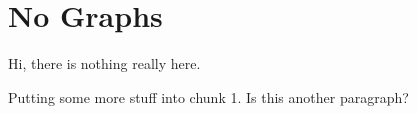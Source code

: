 \section{No Graphs}
\label{sec:NoGraph}
Hi, there is nothing really here.

Putting some more stuff into chunk 1.
Is this another paragraph?

